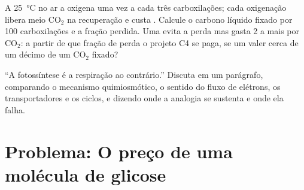 \begin{exercise}[$\star\star\star$]\label{exo:b1:photosynthesis:11}
A \qty{25}{\celsius} no ar a  oxigena uma vez a cada três
carboxilações; cada oxigenação libera meio $\mathrm{CO_2}$ na
recuperação e custa . Calcule o carbono líquido fixado por 100
carboxilações e a fração perdida. Uma  evita a perda mas gasta
2  a mais por $\mathrm{CO_2}$: a partir de que fração de perda o
projeto C4 se paga, se um  valer cerca de um décimo de um
$\mathrm{CO_2}$ fixado?
\end{exercise}

\begin{exercise}[$\star\star\star$]\label{exo:b1:photosynthesis:12}
``A fotossíntese é a respiração ao contrário.'' Discuta em um parágrafo,
comparando o mecanismo quimiosmótico, o sentido do fluxo de elétrons, os
transportadores e os ciclos, e dizendo onde a analogia se sustenta e
onde ela falha.
\end{exercise}

\section{Problema: O preço de uma molécula de glicose}

